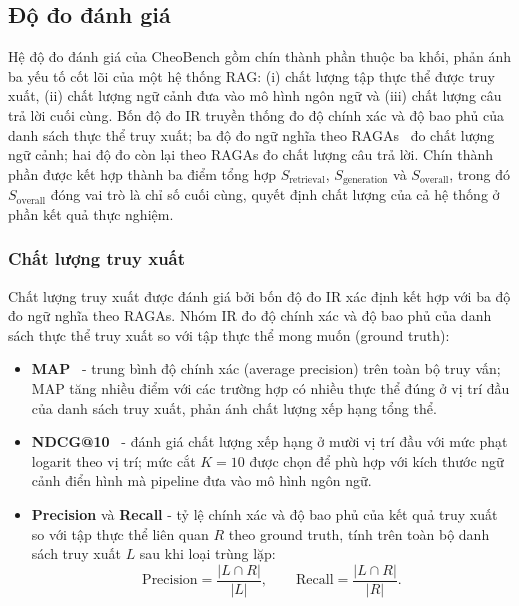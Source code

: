 \subsection{Độ đo đánh giá}

Hệ độ đo đánh giá của CheoBench gồm chín thành phần thuộc ba khối, phản ánh ba yếu tố cốt lõi của một hệ thống RAG: (i) chất lượng tập thực thể được truy xuất, (ii) chất lượng ngữ cảnh đưa vào mô hình ngôn ngữ và (iii) chất lượng câu trả lời cuối cùng. Bốn độ đo IR truyền thống đo độ chính xác và độ bao phủ của danh sách thực thể truy xuất; ba độ đo ngữ nghĩa theo RAGAs~\cite{es2023ragas} đo chất lượng ngữ cảnh; hai độ đo còn lại theo RAGAs đo chất lượng câu trả lời. Chín thành phần được kết hợp thành ba điểm tổng hợp $S_{\text{retrieval}}$, $S_{\text{generation}}$ và $S_{\text{overall}}$, trong đó $S_{\text{overall}}$ đóng vai trò là chỉ số cuối cùng, quyết định chất lượng của cả hệ thống ở phần kết quả thực nghiệm.

\subsubsection{Chất lượng truy xuất}

Chất lượng truy xuất được đánh giá bởi bốn độ đo IR xác định kết hợp với ba độ đo ngữ nghĩa theo RAGAs. Nhóm IR đo độ chính xác và độ bao phủ của danh sách thực thể truy xuất so với tập thực thể mong muốn (ground truth):

\begin{itemize}
  \item \textbf{MAP}~\cite{manning2008ir} - trung bình độ chính xác (average precision) trên toàn bộ truy vấn; MAP tăng nhiều điểm với các trường hợp có nhiều thực thể đúng ở vị trí đầu của danh sách truy xuất, phản ánh chất lượng xếp hạng tổng thể.

  \item \textbf{NDCG@10}~\cite{jarvelin2002ndcg} - đánh giá chất lượng xếp hạng ở mười vị trí đầu với mức phạt logarit theo vị trí; mức cắt $K = 10$ được chọn để phù hợp với kích thước ngữ cảnh điển hình mà pipeline đưa vào mô hình ngôn ngữ.

  \item \textbf{Precision} và \textbf{Recall} - tỷ lệ chính xác và độ bao phủ của kết quả truy xuất so với tập thực thể liên quan $R$ theo ground truth, tính trên toàn bộ danh sách truy xuất $L$ sau khi loại trùng lặp:
    \begin{equation}
      \text{Precision} = \frac{|L \cap R|}{|L|}, \qquad \text{Recall} = \frac{|L \cap R|}{|R|}.
    \end{equation}
\end{itemize}

